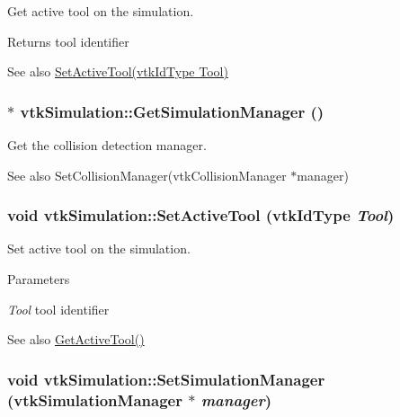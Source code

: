 Get active tool on the simulation. \begin{DoxyReturn}{Returns}
tool identifier 
\end{DoxyReturn}
\begin{DoxySeeAlso}{See also}
\hyperlink{classvtkSimulation_a1f7164f2c7bfe4c3b2498d913d5ecf63}{SetActiveTool(vtkIdType Tool)} 
\end{DoxySeeAlso}
\hypertarget{classvtkSimulation_a24f8f2f19d4d068aa53d24bc3a2ec9d1}{
\subsubsection[{GetSimulationManager}]{ $\ast$ vtkSimulation::GetSimulationManager ()}}
\label{classvtkSimulation_a24f8f2f19d4d068aa53d24bc3a2ec9d1}


Get the collision detection manager. \begin{DoxySeeAlso}{See also}
SetCollisionManager(vtkCollisionManager $\ast$manager) 
\end{DoxySeeAlso}
\hypertarget{classvtkSimulation_a1f7164f2c7bfe4c3b2498d913d5ecf63}{
\subsubsection[{SetActiveTool}]{\setlength{\rightskip}{0pt plus 5cm}void vtkSimulation::SetActiveTool (vtkIdType {\em Tool})}}
\label{classvtkSimulation_a1f7164f2c7bfe4c3b2498d913d5ecf63}


Set active tool on the simulation. 
\begin{DoxyParams}{Parameters}
\item[{\em Tool}]tool identifier \end{DoxyParams}
\begin{DoxySeeAlso}{See also}
\hyperlink{classvtkSimulation_a832386edded984585c69bcdaf4800f60}{GetActiveTool()} 
\end{DoxySeeAlso}
\hypertarget{classvtkSimulation_ae07347b307c27d7a322a29b5f14f2715}{
\subsubsection[{SetSimulationManager}]{\setlength{\rightskip}{0pt plus 5cm}void vtkSimulation::SetSimulationManager ({\bf vtkSimulationManager} $\ast$ {\em manager})}}
\label{classvtkSimulation_ae07347b307c27d7a322a29b5f14f2715}


